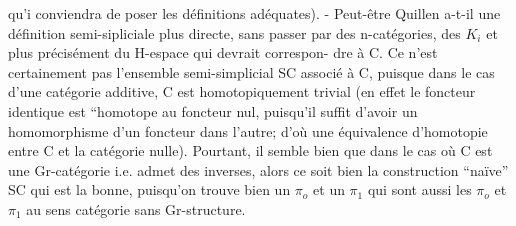 
qu'i conviendra de poser les définitions adéquates). - Peut-être Quillen\linebreak
{} a-t-il une définition semi-sipliciale plus directe, sans passer par des\linebreak
n-catégories, des $K_i$ et plus précisément du H-espace qui devrait correspon-\linebreak
dre à C.  Ce n'est certainement pas  l'ensemble semi-simplicial\linebreak
SC  associé à C, puisque dans le cas d'une catégorie additive,\linebreak
C est homotopiquement trivial (en effet le foncteur identique est ``homotope\linebreak
au foncteur nul, puisqu'il suffit d'avoir un homomorphisme d'un foncteur\linebreak
dans l'autre; d'où une équivalence d'homotopie entre C et la catégorie\linebreak
nulle). Pourtant, il semble bien que dans le cas où C est une Gr-catégorie\linebreak
\margin{\unsure{$\xi$|$\zeta$}} i.e. admet des inverses, alors ce soit bien la construction ``naïve'' SC qui\linebreak
est la bonne, puisqu'on trouve bien un $\pi_o$ et un $\pi_1$ qui sont aussi les\linebreak
$\pi_o$ et $\pi_1$ au sens catégorie sans Gr-structure.


